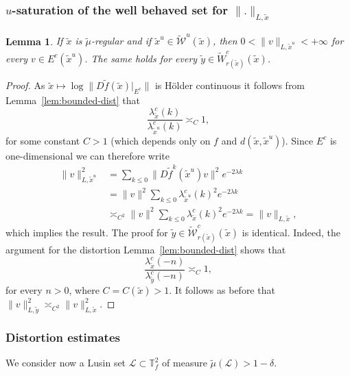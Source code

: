 \documentclass[a4paper,11pt,reqno]{amsart}
\def\tW{\widetilde W}
\newcommand{\TTf}{{\mathbb{T}_f^2}}
\newcommand{\cL}{{\mathcal L}}
\newcommand{\cW}{{\mathcal W}}
\newcommand{\tix}{\tilde{x}}
\newcommand{\tif}{\tilde{f}}
\newcommand{\w}{\widetilde{\cW}}
\newtheorem{lemma}[theorem]{Lemma}
\theoremstyle{definition}
\begin{document}
\subsubsection{$u$-saturation of the well behaved set for $\|.\|_{L,\tix}$}

\begin{lemma}
\label{lem:saturalyapunov}
    If $\tix$ is $\tilde{\mu}$-regular and if $\tix^u\in\tilde{\cW}^u(\tix)$, then $0<\|v\|_{L,\tix^u}<+\infty$ for every $v\in E^c(\tix^u)$. The same holds for every $\tilde{y}\in\tW^c_{r(\tix)}(\tix)$.
\end{lemma}
\begin{proof}
As $\tix\mapsto\log\|D\tif(\tix)|_{E^c}\|$ is Hölder continuous it follows from Lemma~\ref{lem:bounded-dist} that 
\[
\frac{\lambda^c_{\tix}(k)}{\lambda^c_{\tix^u}(k)}\asymp_{C}1,
\]
for some constant $C>1$ (which depends only on $f$ and $d(\tix,\tix^u)$). Since $E^c$ is one-dimensional we can therefore write 
\begin{align*}
        \|v\|^2_{L,\tix^u}&=\sum_{k\leq 0}\|D\tif^k(\tix^u)v\|^2e^{-2\lambda k}\nonumber\\
    &=\|v\|^2\sum_{k\leq 0}\lambda^c_{\tix^u}(k)^2e^{-2\lambda k}\nonumber\\
    &\asymp_{C^2}\|v\|^2\sum_{k\leq 0}\lambda^c_{\tix}(k)^2e^{-2\lambda k}=\|v\|_{L,\tix},
\end{align*}
which implies the result. The proof for $\tilde{y}\in\w^c_{r(\tix)}(\tix)$ is identical. Indeed, the argument for the distortion Lemma~\ref{lem:bounded-dist} shows that 
\[
\frac{\lambda^c_{\tix}(-n)}{\lambda^c_{\tilde{y}}(-n)}\asymp_C 1,
\]
for every $n>0$, where $C=C(\tix)>1$. It follows as before that $\|v\|^2_{L,\tilde{y}}\asymp_{C^2}\|v\|_{L,\tix}^2$.   
\end{proof}

\subsubsection{Distortion estimates}

We consider now a Lusin set $\cL\subset\TTf$ of measure $\tilde{\mu}(\cL)>1-\delta$.
\end{document}
